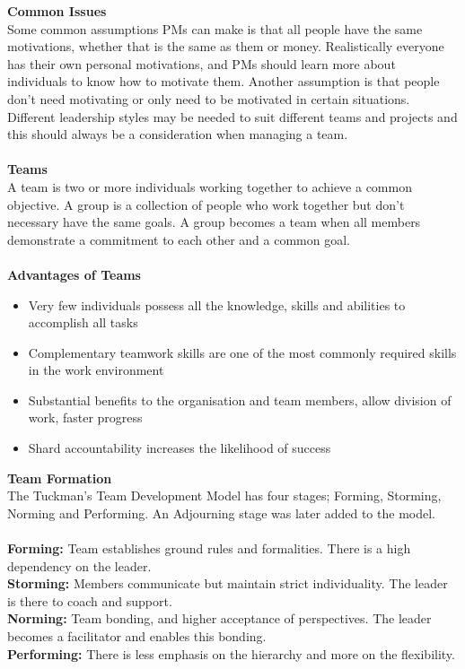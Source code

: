 \documentclass[a4paper,10pt]{article}
\begin{document}
\textbf{Common Issues} \\
Some common assumptions PMs can make is that all people have the same motivations, whether that is the same as them or money. Realistically everyone has their own personal motivations, and PMs should learn more about individuals to know how to motivate them. Another assumption is that people don't need motivating or only need to be motivated in certain situations. Different leadership styles may be needed to suit different teams and projects and this should always be a consideration when managing a team. \\\\
\textcolor{BlueGreen}{\textbf{Teams}} \\
A team is two or more individuals working together to achieve a common objective. A group is a collection of people who work together but don't necessary have the same goals. A group becomes a team when all members demonstrate a commitment to each other and a common goal. \\\\
\textbf{Advantages of Teams} 
\begin{itemize}
	\item Very few individuals possess all the knowledge, skills and abilities to accomplish all tasks 
	\item Complementary teamwork skills are one of the most commonly required skills in the work environment 
	\item Substantial benefits to the organisation and team members, allow division of work, faster progress 
	\item Shard accountability increases the likelihood of success
\end{itemize}
\textcolor{BlueGreen}{\textbf{Team Formation}} \\ 
The Tuckman's Team Development Model has four stages; Forming, Storming, Norming and Performing. An Adjourning stage was later added to the model. \\\\
\textbf{Forming:} Team establishes ground rules and formalities. There is a high dependency on the leader. \\
\textbf{Storming:} Members communicate but maintain strict individuality. The leader is there to coach and support. \\
\textbf{Norming:} Team bonding, and higher acceptance of perspectives. The leader becomes a facilitator and enables this bonding. \\
\textbf{Performing:} There is less emphasis on the hierarchy and more on the flexibility. \\ 
\end{document}
